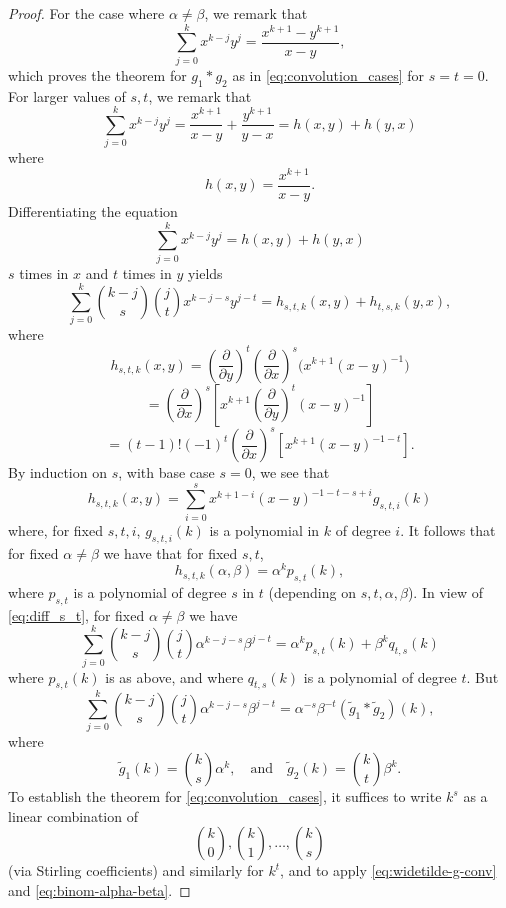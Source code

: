 \documentclass{memo-l}
\theoremstyle{plain}
\theoremstyle{definition}
\numberwithin{section}{chapter}
\numberwithin{equation}{chapter}
\theoremstyle{plain}
\theoremstyle{definition}
\begin{document}
\begin{proof}
For the case where \( \alpha \neq \beta \), we remark that 
$$
\sum_{j=0}^k x^{k-j} y^j = \frac{x^{k+1}-y^{k+1}}{x-y},
$$
which proves the theorem for $g_1 \ast g_2$ as in
\eqref{eq:convolution_cases}
for $s=t=0$.
For larger values of $s,t$, we remark that
$$
\sum_{j=0}^k x^{k-j} y^j = \frac{x^{k+1}}{x-y} + \frac{y^{k+1}}{y-x}
=
h(x,y)+h(y,x)
$$
where
$$
h(x,y) = \frac{x^{k+1}}{x-y}.
$$
Differentiating the equation
$$
\sum_{j=0}^k x^{k-j} y^j
=
h(x,y)+h(y,x)
$$
% 
\( s \) times in \( x \) and
\( t \) times in \( y \) yields 
\begin{equation}\label{eq:diff_s_t}
\sum_{j=0}^k \binom{k-j}{s} \binom{j}{t}
 x^{k-j-s}y^{j-t} = 
 h_{s,t,k}(x,y) + 
 h_{t,s,k}(y,x), 
\end{equation}
where
$$
h_{s,t,k}(x,y) = \left(\frac{\partial}{\partial y}\right)^t
\left(\frac{\partial}{\partial x}\right)^s
\bigl( x^{k+1}(x-y)^{-1} \bigr)
$$
$$
=\left(\frac{\partial}{\partial x}\right)^s
\left[ x^{k+1} \left(\frac{\partial}{\partial y}\right)^t (x-y)^{-1} \right]
$$
$$
=(t-1)!(-1)^t\left(\frac{\partial}{\partial x}\right)^s 
\left[ x^{k+1} (x-y)^{-1-t} \right] .
$$
By induction on $s$, with base case $s=0$, we see that
$$
h_{s,t,k}(x,y) = 
\sum_{i=0}^s
x^{k+1-i} (x-y)^{-1-t-s+i} g_{s,t,i}(k)
$$
where, for fixed $s,t,i$, $g_{s,t,i}(k)$ 
is a polynomial in $k$ of degree $i$.
It follows that for fixed $\alpha\ne\beta$ we have that for fixed $s,t$,
$$
h_{s,t,k}(\alpha,\beta)=\alpha^k p_{s,t}(k),
$$
where $p_{s,t}$ is a polynomial of degree $s$ in $t$ (depending on
$s,t,\alpha,\beta$).  In view of \eqref{eq:diff_s_t},
for fixed $\alpha\ne\beta$ we have
\begin{equation}\label{eq:binom-alpha-beta}
\sum_{j=0}^k \binom{k-j}{s} \binom{j}{t}
 \alpha^{k-j-s}\beta^{j-t} = 
\alpha^k p_{s,t}(k)
+
\beta^k q_{t,s}(k) 
\end{equation}
where $p_{s,t}(k)$ is as above, and where $q_{t,s}(k)$ is a polynomial
of degree $t$.
But
\begin{equation}\label{eq:widetilde-g-conv}
\sum_{j=0}^k \binom{k-j}{s} \binom{j}{t}
 \alpha^{k-j-s}\beta^{j-t} = 
\alpha^{-s}\beta^{-t}(\widetilde g_1 \ast \widetilde g_2)(k),
\end{equation}
where
$$
\widetilde g_1(k) = \binom{k}{s}\alpha^k, \quad\mbox{and}\quad
\widetilde g_2(k) = \binom{k}{t}\beta^k.
$$
To establish the theorem for \eqref{eq:convolution_cases}, it suffices
to write $k^s$
as a linear combination of
$$
\binom{k}{0} , \binom{k}{1} ,\ldots,\binom{k}{s}
$$
(via Stirling coefficients) and similarly for $k^t$, and to apply
\eqref{eq:widetilde-g-conv} and \eqref{eq:binom-alpha-beta}.
\end{proof}
%
%
%
%
\end{document}
